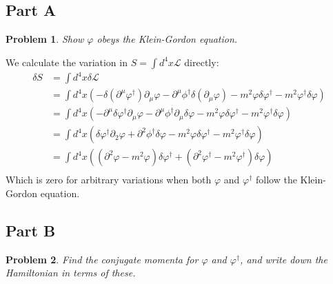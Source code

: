 \documentclass[fontsize=11pt]{scrartcl} %
\numberwithin{equation}{section} %
\numberwithin{figure}{section} %
\numberwithin{table}{section} %
\newtheorem*{problem}{Problem}
\begin{document}
\subsection*{Part A}
\begin{problem}
    Show $\varphi$ obeys the Klein-Gordon equation.
\end{problem}
We calculate the variation in $S = \int d^4x\mathscr{L}$ directly:
\[
\begin{aligned}
    \delta S &= \int d^4x \delta\mathscr{L}\\
    &=\int d^4x \left(
    -\delta(\partial^{\mu}\varphi^{\dagger})\partial_{\mu}\varphi
    -\partial^{\mu}\phi^{\dagger}\delta(\partial_{\mu}\varphi)
    -m^2\varphi\delta\varphi^{\dagger}
    -m^2\varphi^{\dagger}\delta\varphi\right)\\
    &=\int d^4x \left(
    -\partial^{\mu}\delta\varphi^{\dagger}\partial_{\mu}\varphi
    -\partial^{\mu}\phi^{\dagger}\partial_{\mu}\delta\varphi
    -m^2\varphi\delta\varphi^{\dagger}
    -m^2\varphi^{\dagger}\delta\varphi\right)\\
    &=\int d^4x \left(
    \delta\varphi^{\dagger}\partial_{2}\varphi
    +\partial^{2}\phi^{\dagger}\delta\varphi
    -m^2\varphi\delta\varphi^{\dagger}
    -m^2\varphi^{\dagger}\delta\varphi\right)\\
    &=\int d^4x \left(
        \left( \partial^2\varphi-m^2\varphi \right)\delta\varphi^{\dagger}
        +\left( \partial^2\varphi^{\dagger}-m^2\varphi^{\dagger}
        \right)\delta\varphi
    \right)\\
\end{aligned}
\]
Which is zero for arbitrary variations when both $\varphi$ and
$\varphi^{\dagger}$ follow the Klein-Gordon equation.


\newpage

\subsection*{Part B}
\begin{problem}
    Find the conjugate momenta for $\varphi$ and $\varphi^{\dagger}$, and write down
    the Hamiltonian in terms of these.
\end{problem}
\end{document}
